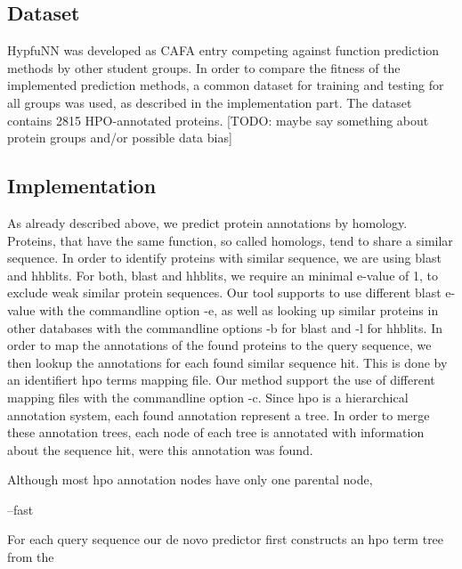 \subsection{Dataset}

HypfuNN was developed as CAFA\citep{CAFA} entry competing against function prediction methods by other student groups. In order to compare the fitness of the implemented prediction methods, a common dataset for training and testing for all groups was used, as described in the implementation part. The dataset contains 2815 HPO-annotated proteins. [TODO: maybe say something about protein groups and/or possible data bias]

\subsection{Implementation}

As already described above, we predict protein annotations by homology. Proteins, that have the same function, so called homologs, tend to share a similar sequence. In order to identify proteins
with similar sequence, we are using blast and hhblits. For both, blast and hhblits, we require an minimal e-value of 1, to exclude weak similar protein sequences. Our tool supports to use
different blast e-value with the commandline option -e, as well as looking up similar proteins in other databases with the commandline options -b for blast and -l for hhblits.\newline
In order to map the annotations of the found proteins to the query sequence, we then lookup the annotations for each found similar sequence hit. This is done by an identifiert hpo terms mapping file.
Our method support the use of different mapping files with the commandline option -c.\newline
Since hpo is a hierarchical annotation system, each found annotation represent a tree. In order to merge these annotation trees, each node of each tree is annotated with information about the sequence
hit, were this annotation was found.

Although most hpo annotation nodes have only one parental node, 





--fast 


For each query sequence our de novo predictor first constructs an hpo term tree from the 
